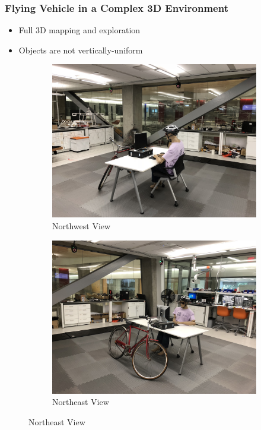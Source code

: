 \documentclass[11pt,professionalfonts,hyperref={pdftex,pdfpagemode=none,pdfstartview=FitH}]{beamer}
\begin{document}
%
%
%
%



\begin{frame}
\frametitle{Flying Vehicle in a Complex 3D Environment}
\begin{itemize}
        	\item Full 3D mapping and exploration
	\item Objects are not vertically-uniform
\end{itemize}


\begin{figure}
  \centering
  \begin{subfigure}[t]{.4\linewidth}
    \centering\includegraphics[height=.7\linewidth]{explore3D_space_NW.JPG}
    \caption*{Northwest View}
  \end{subfigure}
  \begin{subfigure}[t]{.4\linewidth}
    \centering\includegraphics[height=.7\linewidth]{explore3D_space_NE.JPG}
    \caption*{Northeast View}
  \end{subfigure}
\end{figure}
\end{frame}
\end{document}
